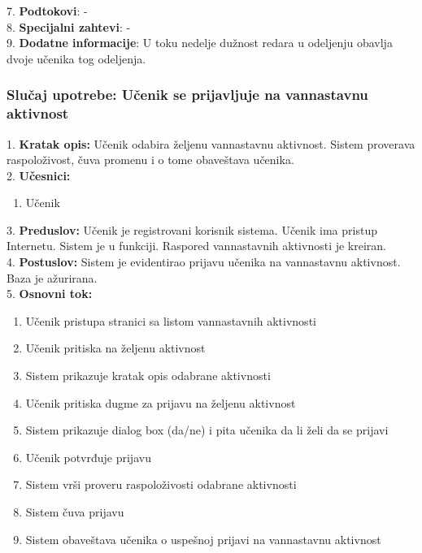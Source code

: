 \documentclass{article}
\begin{document}
7. \textbf{Podtokovi}: - \\

8. \textbf{Specijalni zahtevi}: - \\

9. \textbf{Dodatne informacije}:  U toku nedelje dužnost redara u odeljenju obavlja dvoje učenika tog odeljenja. \\


\subsubsection{Slučaj upotrebe: Učenik se prijavljuje na vannastavnu aktivnost} 
1. \textbf{Kratak opis:} Učenik odabira željenu vannastavnu aktivnost. Sistem proverava raspoloživost, čuva promenu i o tome obaveštava učenika. \\

2. \textbf{Učesnici:}
\begin{enumerate} [label=(\alph*)]
\item Učenik
\end{enumerate} 

3. \textbf{Preduslov:} Učenik je registrovani korisnik sistema. Učenik ima pristup Internetu. Sistem je u funkciji. Raspored vannastavnih aktivnosti je kreiran. \\

4. \textbf{Postuslov:} Sistem je evidentirao prijavu učenika na vannastavnu aktivnost. Baza je ažurirana. \\

5. \textbf{Osnovni tok:} 
\begin{enumerate} [label=(\alph*)]
\item Učenik pristupa stranici sa listom vannastavnih aktivnosti
\item Učenik pritiska na željenu aktivnost
\item Sistem prikazuje kratak opis odabrane aktivnosti
\item Učenik pritiska dugme za prijavu na željenu aktivnost
\item Sistem prikazuje dialog box (da/ne) i pita učenika da li želi da se prijavi
\item Učenik potvrđuje prijavu
\item Sistem vrši proveru raspoloživosti odabrane aktivnosti
\item Sistem čuva prijavu
\item Sistem obaveštava učenika o uspešnoj prijavi na vannastavnu aktivnost
\end{enumerate}
\end{document}
